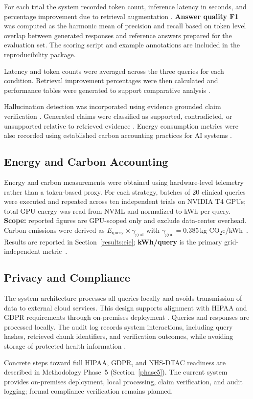 For each trial the system recorded token count, inference latency in seconds, and percentage improvement due to retrieval augmentation \cite{amugongo2025retrieval}. \textbf{Answer quality F1} was computed as the harmonic mean of precision and recall based on token level overlap between generated responses and reference answers prepared for the evaluation set. The scoring script and example annotations are included in the reproducibility package.
 
Latency and token counts were averaged across the three queries for each condition. Retrieval improvement percentages were then calculated and performance tables were generated to support comparative analysis \cite{xiong2024rag}.
 
Hallucination detection was incorporated using evidence grounded claim verification \cite{asgari2022hallucination, nishizaki2025reducing}. Generated claims were classified as supported, contradicted, or unsupported relative to retrieved evidence \cite{xu2025mega}. Energy consumption metrics were also recorded using established carbon accounting practices for AI systems \cite{ren2024reconciling, dauner2025ai}.
 
\subsection{Energy and Carbon Accounting}
 
Energy and carbon measurements were obtained using hardware-level telemetry rather than a token-based proxy. For each strategy, batches of 20 clinical queries were executed and repeated across ten independent trials on NVIDIA T4 GPUs; total GPU energy was read from NVML and normalized to kWh per query. \textbf{Scope:} reported figures are GPU-scoped only and exclude data-center overhead. Carbon emissions were derived as $E_{\mathrm{query}} \times \gamma_{\mathrm{grid}}$ with $\gamma_{\mathrm{grid}} = 0.385$\,kg CO\textsubscript{2}e/kWh~\cite{patterson2021carbon,strubell2019energy,epa2023egrid}. Results are reported in Section~\ref{results:eie}; \textbf{kWh/query} is the primary grid-independent metric~\cite{ren2024reconciling}.
 
\subsection{Privacy and Compliance}
 
The system architecture processes all queries locally and avoids transmission of data to external cloud services. This design supports alignment with HIPAA and GDPR requirements through on-premises deployment \cite{jonnagaddala2025privacy, jmir2024generative}. Queries and responses are processed locally. The audit log records system interactions, including query hashes, retrieved chunk identifiers, and verification outcomes, while avoiding storage of protected health information \cite{labkoff2024aicds, carlini2021memorization}. 
 
Concrete steps toward full HIPAA, GDPR, and NHS-DTAC readiness are described in Methodology Phase~5 (Section~\ref{phase5}). The current system provides on-premises deployment, local processing, claim verification, and audit logging; formal compliance verification remains planned.